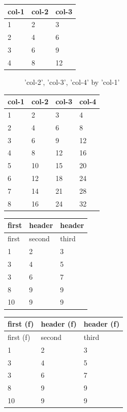\documentclass[11pt,a4paper]{article}
\begin{document}
\begin{table}[h]
\begin{tabular}{|l|l|l|}
\hline
col-1 & col-2 & col-3 \\ \hline
1 & 2 & 3 \\ \hline
2 & 4 & 6 \\ \hline
3 & 6 & 9 \\ \hline
4 & 8 & 12 \\ \hline
\end{tabular}
\end{table}

\begin{figure}[h]
\caption{'col-2', 'col-3', 'col-4' by 'col-1'}
\end{figure}

\begin{table}[h]
\begin{tabular}{|l|l|l|l|}
\hline
col-1 & col-2 & col-3 & col-4 \\ \hline
1 & 2 & 3 & 4 \\ \hline
2 & 4 & 6 & 8 \\ \hline
3 & 6 & 9 & 12 \\ \hline
4 & 8 & 12 & 16 \\ \hline
5 & 10 & 15 & 20 \\ \hline
6 & 12 & 18 & 24 \\ \hline
7 & 14 & 21 & 28 \\ \hline
8 & 16 & 24 & 32 \\ \hline
\end{tabular}
\end{table}

\begin{table}[h]
\begin{tabular}{|l|l|l|}
\hline
first  & header & header \\ \hline
first  & second  & third \\ \hline
1 & 2 & 3 \\ \hline
3 & 4 & 5 \\ \hline
3 & 6 & 7 \\ \hline
8 & 9 & 9 \\ \hline
10 & 9 & 9 \\ \hline
\end{tabular}
\end{table}

\begin{table}[h]
\begin{tabular}{|l|l|l|}
\hline
first (f) & header (f) & header (f) \\ \hline
first (f) & second  & third \\ \hline
1 & 2 & 3 \\ \hline
3 & 4 & 5 \\ \hline
3 & 6 & 7 \\ \hline
8 & 9 & 9 \\ \hline
10 & 9 & 9 \\ \hline
\end{tabular}
\end{table}

\begin{figure}[h]
\end{figure}
\end{document}
